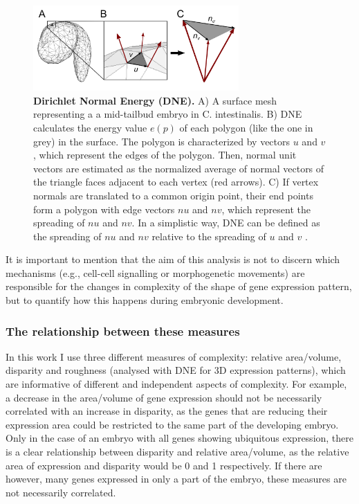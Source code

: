 \begin{figure}[h]
  \includegraphics[width=0.7\textwidth]{./Images/DNE.png}
  \centering
  \caption{\textbf{Dirichlet Normal Energy (DNE).} A) A surface mesh representing a a mid-tailbud embryo in C. intestinalis. B) DNE calculates the energy value $e(p)$ of each polygon (like the one in grey) in the surface. The polygon is characterized by vectors $u$ and $v$, which represent the edges of the polygon. Then, normal unit vectors are estimated as the normalized average of normal vectors of the triangle faces adjacent to each vertex (red arrows). C) If vertex normals are translated to a common origin point, their end points form a polygon with edge vectors $nu$ and $nv$, which represent the spreading of $nu$ and $nv$. In a simplistic way, DNE can be defined as the spreading of $nu$ and $nv$ relative to the spreading of $u$ and $v$ \citep{Bunn2011,Winchester2016}. 
 }
  \label{fig:DNE}
\end{figure}



It is important to mention that the aim of this analysis is not to discern which mechanisms (e.g., cell-cell signalling or morphogenetic movements) are responsible for the changes in complexity of the shape of gene expression pattern, but to quantify how this happens during embryonic development.

\subsubsection{The relationship between these measures}

In this work I use three different measures of complexity: relative area/volume, disparity and roughness (analysed with DNE for 3D expression patterns), which are informative of different and independent aspects of complexity. For example, a decrease in the area/volume of gene expression should not be necessarily correlated with an increase in disparity, as the genes that are reducing their expression area could be restricted to the same part of the developing embryo. Only in the case of an embryo with all genes showing ubiquitous expression, there is a clear relationship between disparity and relative area/volume, as the relative area of expression and disparity would be 0 and 1 respectively. If there are however, many genes expressed in only a part of the embryo, these measures are not necessarily correlated. 

